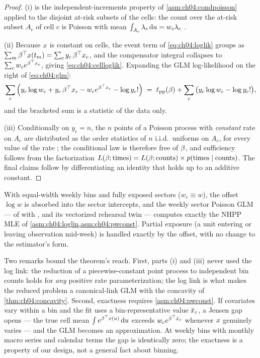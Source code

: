 \begin{proof}
(i) is the independent-increments property of
\cref{asm:ch04:condpoisson} applied to the disjoint at-risk subsets of the
cells: the count over the at-risk subset $A_c$ of cell $c$ is Poisson with
mean $\int_{A_c} \lambda_c \,\mathrm{d} u = w_c \lambda_c$
\citep{kingman1993}.

(ii) Because $x$ is constant on cells, the event term of
\cref{eq:ch04:loglik} groups as $\sum_m \beta^{\top}x(t_m) = \sum_c y_c\,
\beta^{\top}x_c$, and the compensator integral collapses to $\sum_c w_c
e^{\beta^{\top}x_c}$, giving \cref{eq:ch04:cellloglik}. Expanding the GLM
log-likelihood on the right of \cref{eq:ch04:glm}:
\[
\sum_c \Big( y_c \log w_c + y_c\,\beta^{\top}x_c
 - w_c e^{\beta^{\top}x_c} - \log y_c! \Big)
 \;=\;
\ell_{\mathrm{pp}}(\beta)
 + \sum_c \big( y_c \log w_c - \log y_c! \big),
\]
and the bracketed sum is a statistic of the data only.

(iii) Conditionally on $y_c = n$, the $n$ points of a Poisson process with
\emph{constant} rate on $A_c$ are distributed as the order statistics of
$n$ i.i.d.\ uniforms on $A_c$, for every value of the rate
\citep{kingman1993}; the conditional law is therefore free of $\beta$,
and sufficiency follows from the factorization
$L(\beta; \text{times}) = L(\beta; \text{counts}) \times
p(\text{times} \mid \text{counts})$. The final claims follow by
differentiating an identity that holds up to an additive constant.
\end{proof}

\begin{corollary}\label{cor:ch04:repoglm}
With equal-width weekly bins and fully exposed sectors ($w_c \equiv w$),
the offset $\log w$ is absorbed into the sector intercepts, and the weekly
sector Poisson GLM ---  of
 with , and its vectorized
rehearsal twin  --- computes
exactly the NHPP MLE of
\cref{asm:ch04:loglin,asm:ch04:pwconst}. Partial exposure (a unit entering
or leaving observation mid-week) is handled exactly by the offset, with no
change to the estimator's form.
\end{corollary}

Two remarks bound the theorem's reach. First, parts (i) and (iii) never
used the log link: the reduction of a piecewise-constant point process to
independent bin counts holds for \emph{any} positive rate
parameterization; the log link is what makes the reduced problem a
canonical-link GLM with the concavity of \cref{thm:ch04:concavity}.
Second, exactness requires \cref{asm:ch04:pwconst}. If covariates vary
within a bin and the fit uses a bin-representative value $\bar{x}_c$, a
Jensen gap opens --- the true cell mean $\int e^{\beta^{\top}x(u)}\,\mathrm{d} u$
exceeds $w_c e^{\beta^{\top}\bar{x}_c}$ whenever $x$ genuinely varies
--- and the GLM becomes an approximation. At weekly bins with monthly
macro series and calendar terms the gap is identically zero; the exactness
is a property of our design, not a general fact about binning.

